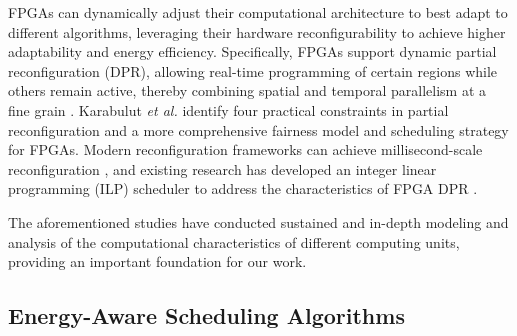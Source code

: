 \documentclass{IEEEtaes}
\begin{document}
FPGAs can dynamically adjust their computational architecture to best adapt to different algorithms, leveraging their hardware reconfigurability to achieve higher adaptability and energy efficiency. Specifically, FPGAs support dynamic partial reconfiguration (DPR), allowing real-time programming of certain regions while others remain active, thereby combining spatial and temporal parallelism at a fine grain \cite{b34}. Karabulut \textit{et al.}\cite{b35} identify four practical constraints in partial reconfiguration and  a more comprehensive fairness model and scheduling strategy for FPGAs. Modern reconfiguration frameworks can achieve millisecond-scale reconfiguration \cite{b2}, and existing research has developed an integer linear programming (ILP) scheduler to address the characteristics of FPGA DPR \cite{b5}. 

The aforementioned studies have conducted sustained and in-depth modeling and analysis of the computational characteristics of different computing units, providing an important foundation for our work. 

\subsection{Energy-Aware Scheduling Algorithms}
\end{document}
